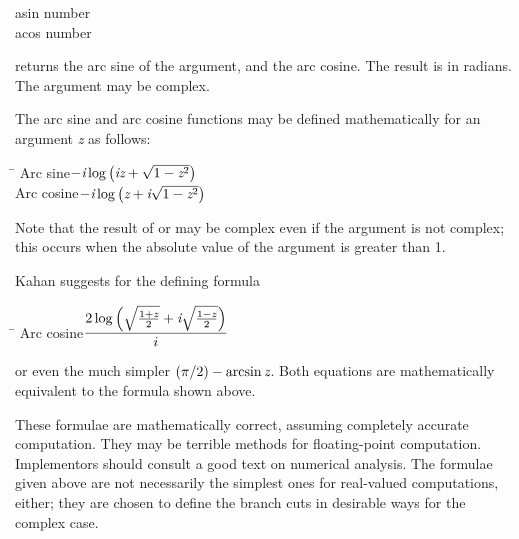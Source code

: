 \begin{defun}[Function]
asin number \\
acos number

 returns the arc sine of the argument, and  the arc cosine.
The result is in radians.  The argument may be complex.

The arc sine and arc cosine functions may be defined mathematically for
an argument \emph{z} as follows:
\begin{tabbing}
\hskip 10pc\=\kill
Arc sine\>$ -\emph{i} \log \left(\emph{i}\emph{z} + \sqrt{1-\emph{z}^2}\right) $ \\[2pt]
Arc cosine\>$ -\emph{i} \log \left(\emph{z} + \emph{i}\sqrt{1-\emph{z}^2}\right) $
\end{tabbing}
Note that the result of  or  may be
complex even if the argument is not complex; this occurs
when the absolute value of the argument is greater than 1.

\begin{newer}
Kahan \cite{KAHAN-COMPLEX-FNS} suggests for  the
defining formula
\begin{tabbing}
\hskip 10pc\=\kill
Arc cosine\>$  \displaystyle { 2 \log \left( \sqrt{{1+\emph{z} \over 2}} + \emph{i} \sqrt{{1-\emph{z} \over 2}} \right) \over i}$
\end{tabbing}
or even the much simpler $ (\pi/2)-\arcsin \emph{z} $.  Both equations are mathematically
equivalent to the formula shown above.
\end{newer}

\beforenoterule
\begin{implementation}
These formulae are mathematically correct, assuming
completely accurate computation.  They may be terrible methods for
floating-point computation.  Implementors should consult a good text on
numerical analysis.  The formulae given above are not necessarily
the simplest ones for real-valued computations, either; they are chosen
to define the branch cuts in desirable ways for the complex case.
\end{implementation}
\afternoterule
\end{defun}

